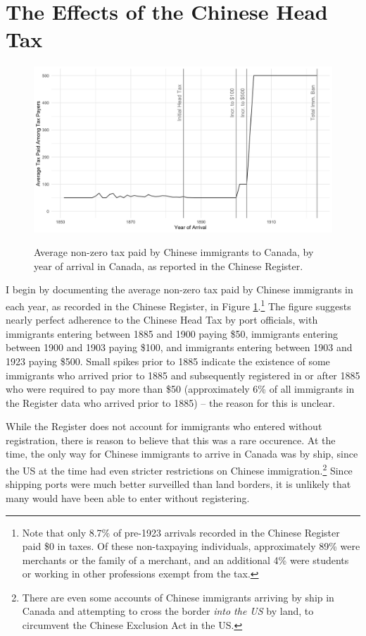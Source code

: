 \documentclass[12pt]{article}
\begin{document}
\section{The Effects of the Chinese Head Tax}

\begin{figure}
    \centering 
    \caption{Average non-zero tax paid by Chinese immigrants to Canada, by year of arrival in Canada, as reported in the Chinese Register.}
    \includegraphics[width=\textwidth]{../../figs/shortpaper_figs/fig1_taxespaid.png}
    \label{fig:taxpaid}
\end{figure}

I begin by documenting the average non-zero tax paid by Chinese immigrants in each year, as recorded in the Chinese Register, in Figure \ref{fig:taxpaid}.\footnote{Note that only 8.7\% of pre-1923 arrivals recorded in the Chinese Register paid \$0 in taxes. Of these non-taxpaying individuals, approximately 89\% were merchants or the family of a merchant, and an additional 4\% were students or working in other professions exempt from the tax.} The figure suggests nearly perfect adherence to the Chinese Head Tax by port officials, with immigrants entering between 1885 and 1900 paying \$50, immigrants entering between 1900 and 1903 paying \$100, and immigrants entering between 1903 and 1923 paying \$500. Small spikes prior to 1885 indicate the existence of some immigrants who arrived prior to 1885 and subsequently registered in or after 1885 who were required to pay more than \$50 (approximately 6\% of all immigrants in the Register data who arrived prior to 1885) -- the reason for this is unclear. 

While the Register does not account for immigrants who entered without registration, there is reason to believe that this was a rare occurence. At the time, the only way for Chinese immigrants to arrive in Canada was by ship, since the US at the time had even stricter restrictions on Chinese immigration.\footnote{There are even some accounts of Chinese immigrants arriving by ship in Canada and attempting to cross the border \textit{into the US }by land, to circumvent the Chinese Exclusion Act in the US.} Since shipping ports were much better surveilled than land borders, it is unlikely that many would have been able to enter without registering. 
\end{document}
